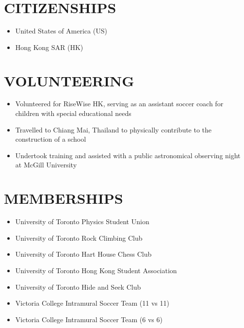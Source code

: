 \documentclass[a4paper,10pt]{extarticle}
\begin{document}
\section*{CITIZENSHIPS}
\begin{itemize}
    \item United States of America (US)

    \item Hong Kong SAR (HK)
\end{itemize}

\newpage
\section*{VOLUNTEERING}
\begin{itemize}
    \item Volunteered for RiseWise HK, serving as an assistant soccer coach for children with special educational needs

    \item Travelled to Chiang Mai, Thailand to physically contribute to the construction of a school

    \item Undertook training and assisted with a public astronomical observing night at McGill University
\end{itemize}

\section*{MEMBERSHIPS}
\begin{itemize}
    \item University of Toronto Physics Student Union

    \item University of Toronto Rock Climbing Club

    \item University of Toronto Hart House Chess Club

    \item University of Toronto Hong Kong Student Association

    \item University of Toronto Hide and Seek Club

    \item Victoria College Intramural Soccer Team (11 vs 11)

    \item Victoria College Intramural Soccer Team (6 vs 6)
\end{itemize}
\end{document}
